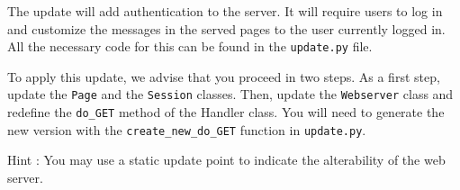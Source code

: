 \documentclass{article}
\begin{document}
The update will add authentication to the server. It will require
users to log in and customize the messages in the served pages to the
user currently logged in. All the necessary code for this can be found
in the \texttt{update.py} file.

To apply this update, we advise that you proceed in two steps. As a
first step, update the \texttt{Page} and the \texttt{Session}
classes. Then, update the \texttt{Webserver} class and redefine the
\texttt{do\_GET} method of the Handler class. You will need to generate
the new version with the \texttt{create\_new\_do\_GET} function in
\texttt{update.py}.

Hint : You may use a static update point to indicate the alterability
of the web server.
\end{document}
